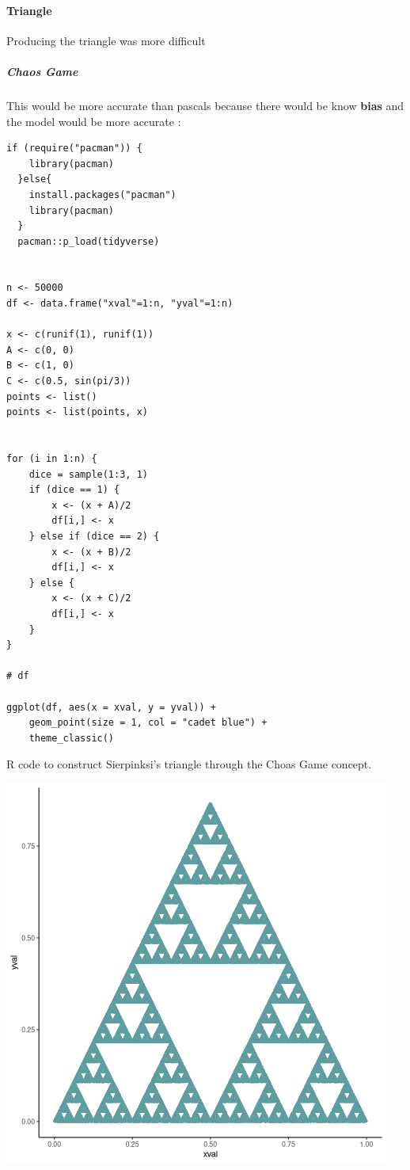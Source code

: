 \documentclass[11pt]{article}
\begin{document}
\paragraph{Triangle}
\label{sec:org4562ef0}
Producing the triangle was more difficult
\subparagraph{Chaos Game}
\label{sec:orga93a62f}
This would be more accurate than pascals because there would be know \textbf{bias} and the model would be more accurate    :

\begin{listing}[htbp]
\begin{verbatim}
if (require("pacman")) {
    library(pacman)
  }else{
    install.packages("pacman")
    library(pacman)
  }
  pacman::p_load(tidyverse)


n <- 50000
df <- data.frame("xval"=1:n, "yval"=1:n)

x <- c(runif(1), runif(1))
A <- c(0, 0)
B <- c(1, 0)
C <- c(0.5, sin(pi/3))
points <- list()
points <- list(points, x)


for (i in 1:n) {
    dice = sample(1:3, 1)
    if (dice == 1) {
        x <- (x + A)/2
        df[i,] <- x
    } else if (dice == 2) {
        x <- (x + B)/2
        df[i,] <- x
    } else {
        x <- (x + C)/2
        df[i,] <- x
    }
}

# df

ggplot(df, aes(x = xval, y = yval)) +
    geom_point(size = 1, col = "cadet blue") +
    theme_classic()

\end{verbatim}
\caption{R code to construct Sierpinksi's triangle through the Choas Game concept.}
\end{listing}


\begin{center}
\includegraphics[width=.9\linewidth]{pascal-sierpinsky-chaos-game.png}
\end{center}
\end{document}

